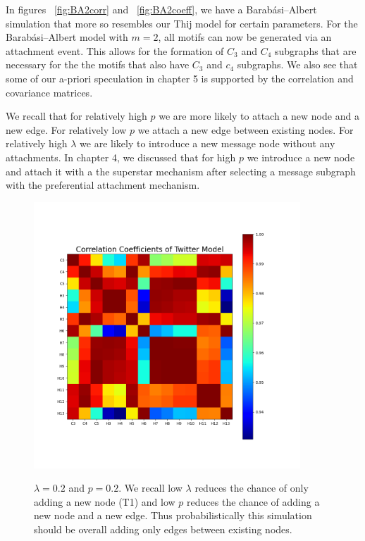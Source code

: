 In figures ~\ref{fig:BA2corr} and ~\ref{fig:BA2coeff}, we have a Barabási–Albert simulation that more so resembles our Thij model for certain parameters. For 
the Barabási–Albert model with $m=2$, all motifs can now be generated via an attachment event.
 This allows for the formation of $C_3$ and $C_4$ subgraphs that are necessary for the
the motifs that also have $C_3$ and $c_4$ subgraphs. We also see that some of our a-priori speculation
in chapter 5 is supported by the correlation and covariance matrices. 


We recall that for relatively high $p$ we are more likely to attach a new node and a new
edge. For relatively low $p$ we attach a new edge between existing nodes. For relatively
high $\lambda$ we are likely to introduce a new message node without any attachments. 
In chapter 4, we discussed that for high $p$ we introduce a new node and attach it with
a the superstar mechanism after selecting a message subgraph with the preferential
attachment mechanism.

\begin{figure}
    \includegraphics[width=10cm]{Images/CorrCoefTwitterModel020209.png}\
    \centering
    \caption{$\lambda=0.2$ and $p=0.2$. We recall low $\lambda$ reduces the chance of only adding a new node (T1)
    and low $p$ reduces the chance of adding a new node and a new edge. Thus 
    probabilistically this simulation should be overall adding only edges between existing nodes.}
\end{figure}

